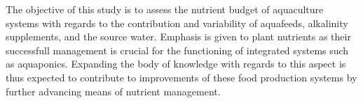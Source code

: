 
The objective of this study is to assess the nutrient budget of aquaculture systems with regards to the contribution and variability of aquafeeds, alkalinity supplements, and the source water. Emphasis is given to plant nutrients as their successfull management is crucial for the functioning of integrated systems such as aquaponics. Expanding the body of knowledge with regards to this aspect is thus expected to contribute to improvements of these food production systems by further advancing means of nutrient management.